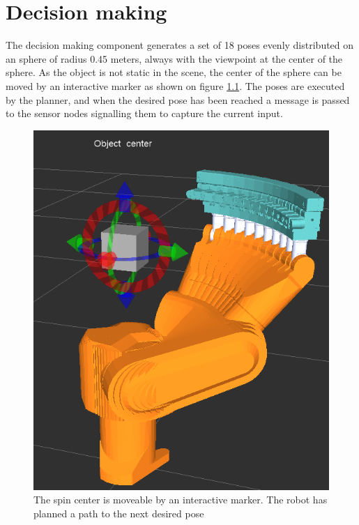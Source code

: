 \chapter{Decision making}
The decision making component generates a set of 18 poses evenly distributed on an sphere of radius 0.45 meters, always with the viewpoint at the center of the sphere. As the object is not static in the scene, the center of the sphere can be moved by an interactive marker as shown on figure \ref{fig:robot_moving_around_object}. The poses are executed by the planner, and when the desired pose has been reached a message is passed to the sensor nodes signalling them to capture the current input.


\begin{figure}[htb]
	\begin{center}
		\includegraphics[scale=0.5,trim=0 0 0 0]{graphics/04_decisionmaking/robot_moving_around_object.png}%
		\caption{The spin center is moveable by an interactive marker. The robot has planned a path to the next desired pose}
		\label{fig:robot_moving_around_object}
	\end{center}
\end{figure}

